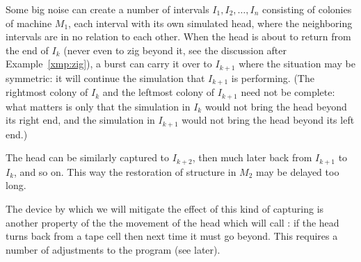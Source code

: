 \documentclass[11pt]{memoir}
\theoremstyle{definition} %
\begin{document}
\begin{example}\label{xmp:feather}
  Some big noise can create a number of intervals \( I_{1},I_{2},\dots,I_{n} \)
  consisting of colonies of machine \( M_{1} \), each interval with its own simulated head,
  where the neighboring intervals are in no relation to each other.
  When the head is about to return from the end of \( I_{k} \)
  (never even to zig beyond it, see the discussion after Example~\ref{xmp:zig}),
  a burst can carry it over to \( I_{k+1} \) where
  the situation may be symmetric: it will continue the simulation that \( I_{k+1} \) is performing.
  (The rightmost colony of \( I_{k} \) and the leftmost colony of \( I_{k+1} \) need not be complete:
  what matters is only that the simulation in \( I_{k} \) would not bring the head beyond its right end,
  and the simulation in \( I_{k+1} \) would not bring the head beyond its left end.)

  The head can be similarly captured to \( I_{k+2} \), then much later back from \( I_{k+1} \) to \( I_{k} \),
  and so on.
  This way the restoration of structure in \( M_{2} \) may be delayed too long.
\end{example}

The device by which we will mitigate the effect of this kind of capturing is another property of the
the movement of the head which will call :
if the head turns back from a tape cell then next time it must go beyond.
This requires a number of adjustments to the program (see later).
\end{document}
